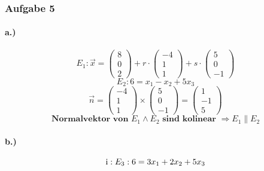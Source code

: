 \documentclass{article}
\newcommand{\RN}[1]{%
  	\textup{\uppercase\expandafter{\romannumeral#1}}%
	}
\begin{document}
\subsubsection*{Aufgabe 5}
\paragraph*{a.)}
\begin{equation}
	E_1 : \overrightarrow{x} = \begin{pmatrix}8\\0\\2\end{pmatrix} + r \cdot \begin{pmatrix}-4\\1\\1\end{pmatrix} + s \cdot \begin{pmatrix}5\\0\\-1\end{pmatrix}
\end{equation}
\begin{equation}
	E_2 : 6 = x_1 - x_2 + 5x_3
\end{equation}
\begin{equation}
 \overrightarrow{n} = \begin{pmatrix}-4\\1\\1\end{pmatrix} \times  \begin{pmatrix}5\\0\\-1\end{pmatrix} =  \begin{pmatrix}1\\-1\\5\end{pmatrix}
\end{equation}
\begin{equation}
 \textbf{Normalvektor von } E_1 \wedge E_2 \textbf{ sind kolinear } \Rightarrow E_1 \parallel E_2
\end{equation}

\paragraph*{b.)}

\begin{equation}
	\RN{1} : E_3 : 6 = 3x_1 + 2x_2 + 5x_3
\end{equation}
\end{document}
